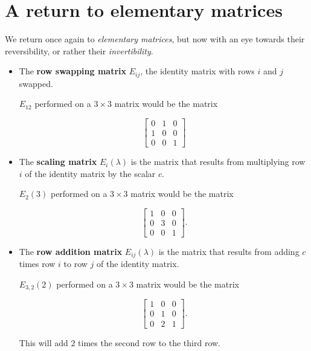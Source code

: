 \documentclass{ximera}
\begin{document}
 
\section*{A return to elementary matrices}

We return once again to \emph{elementary matrices}, but now with an eye towards their reversibility, or rather their \emph{invertibility}.

\begin{itemize}

  \item The \textbf{row swapping matrix} $E_{ij}$, the identity matrix with rows $i$ and $j$ swapped.
  
  $E_{12}$ performed on a $3\times 3$ matrix would be the matrix

  \begin{equation*}
    \begin{bmatrix}
      0 & 1 & 0 \\
      1 & 0 & 0 \\
      0 & 0 & 1
    \end{bmatrix}
  \end{equation*}

  \item The \textbf{scaling matrix} $E_{i}(\lambda)$ is the matrix that results from multiplying row $i$ of the identity matrix by the scalar $c$.
  
  $E_{2}(3)$ performed on a $3\times 3$ matrix would be the matrix

  \begin{equation*}
    \begin{bmatrix}
      1 & 0 & 0 \\
      0 & 3 & 0 \\
      0 & 0 & 1
    \end{bmatrix}.
  \end{equation*}

  \item The \textbf{row addition matrix} $E_{ij}(\lambda)$ is the matrix that results from adding $c$ times row $i$ to row $j$ of the identity matrix.
  
  $E_{3,2}(2)$ performed on a $3\times 3$ matrix would be the matrix

  \begin{equation*}
    \begin{bmatrix}
      1 & 0 & 0 \\
      0 & 1 & 0 \\
      0 & 2 & 1
    \end{bmatrix}.
  \end{equation*}

  This will add $2$ times the second row to the third row.

\end{itemize}
\end{document}

